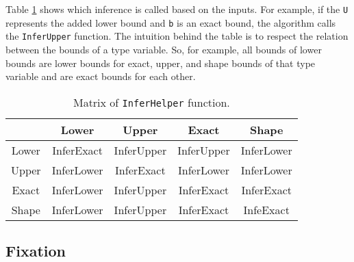 \par
Table \ref{table3:InferHelper} shows which inference is called based on the inputs. 
For example, if the \texttt{U} represents the added lower bound and \texttt{b} is an exact bound, the algorithm calls the \texttt{InferUpper} function. 
The intuition behind the table is to respect the relation between the bounds of a type variable.
So, for example, all bounds of lower bounds are lower bounds for exact, upper, and shape bounds of that type variable and are exact bounds for each other.
\begin{table}[h!]
\begin{center}
\begin{tabular}{ | c | c | c | c | c | } 
  \hline
   & Lower & Upper & Exact & Shape\\
  \hline
  Lower & InferExact  &  InferUpper & InferUpper & InferLower \\
  \hline
  Upper & InferLower  &  InferExact & InferLower & InferLower \\
  \hline
  Exact & InferLower  &  InferUpper & InferExact & InferExact \\
  \hline
  Shape & InferLower  &  InferUpper & InferExact & InfeExact \\
  \hline
\end{tabular}
\end{center}
\caption{Matrix of \texttt{InferHelper} function.}
\label{table3:InferHelper}
\end{table}

\subsection{Fixation}

